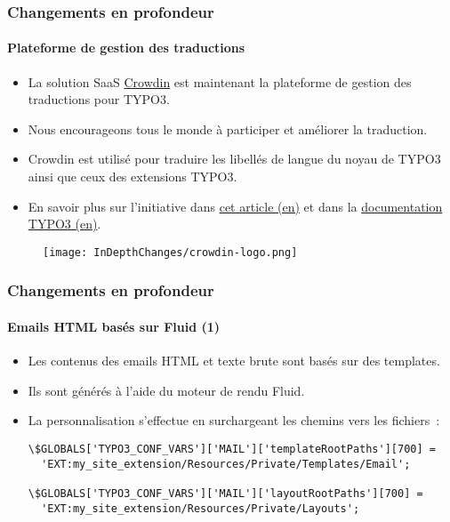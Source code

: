 
\begin{frame}[fragile]
	\frametitle{Changements en profondeur}
	\framesubtitle{Plateforme de gestion des traductions}

	\begin{itemize}
		\item La solution SaaS \href{https://crowdin.com/}{Crowdin} est maintenant la
			plateforme de gestion des traductions pour TYPO3.
		\item Nous encourageons tous le monde à participer et améliorer la traduction.
		\item Crowdin est utilisé pour traduire les libellés de langue du noyau de TYPO3
			ainsi que ceux des extensions TYPO3.
		\item En savoir plus sur l'initiative dans
			\href{https://typo3.org/community/teams/typo3-development/initiatives/localization-with-crowdin/}{cet article (en)}
			et dans la
			\href{https://docs.typo3.org/m/typo3/reference-coreapi/master/en-us/ApiOverview/Internationalization/TranslationServer/Crowdin.html}{documentation TYPO3 (en)}.
	\end{itemize}

	\begin{figure}
		\texttt{[image: InDepthChanges/crowdin-logo.png]}
	\end{figure}

\end{frame}


\begin{frame}[fragile]
	\frametitle{Changements en profondeur}
	\framesubtitle{Emails HTML basés sur Fluid (1)}

	\lstset{basicstyle=\smaller\ttfamily}

	\begin{itemize}
		\item Les contenus des emails HTML et texte brute sont basés sur des templates.
		\item Ils sont générés à l'aide du moteur de rendu Fluid.
		\item La personnalisation s'effectue en surchargeant les chemins vers les fichiers~:
\begin{lstlisting}
\$GLOBALS['TYPO3_CONF_VARS']['MAIL']['templateRootPaths'][700] =
  'EXT:my_site_extension/Resources/Private/Templates/Email';

\$GLOBALS['TYPO3_CONF_VARS']['MAIL']['layoutRootPaths'][700] =
  'EXT:my_site_extension/Resources/Private/Layouts';
\end{lstlisting}

	\end{itemize}

\end{frame}


